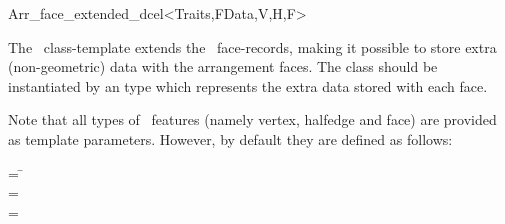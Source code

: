 
\ccRefPageBegin

\begin{ccRefClass}{Arr_face_extended_dcel<Traits,FData,V,H,F>}

\ccDefinition

The \ccRefName\ class-template extends the \dcel\ face-records, making it
possible to store extra (non-geometric) data with the arrangement faces.
The class should be instantiated by an  type which represents the
extra data stored with each face. 

Note that all types of \dcel\ features (namely vertex, halfedge and face)
are provided as template parameters. However, by default they are defined
as follows:

\begin{tabbing}
 = \=\\
 = \>\\
 = \>
\end{tabbing}


\ccIsModel

\ccInheritsFrom

\ccSeeAlso


\end{ccRefClass}

\ccRefPageEnd
